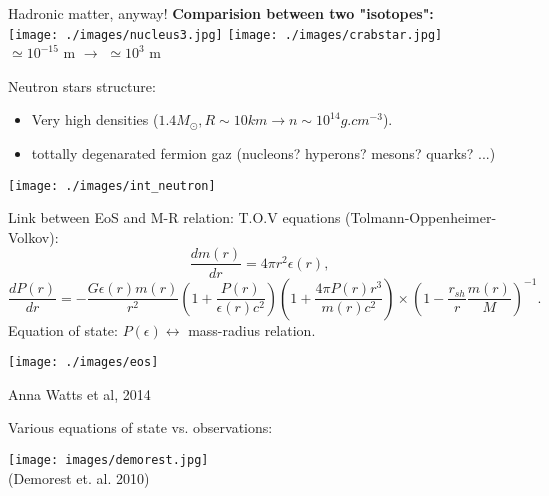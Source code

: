 \documentclass[francais]{beamer}
\begin{document}
\begin{frame}{Hadronic matter, anyway!}
\textbf{Comparision between two "isotopes":}\\
\texttt{[image: ./images/nucleus3.jpg]}\hfill
\texttt{[image: ./images/crabstar.jpg]}\\
\vspace{+0.5cm}
$\simeq 10^{-15}$ m \hspace{+3cm} $\longrightarrow$ \hspace{+3cm} $\simeq 10^{3} $ m
\end{frame}

\begin{frame}{Neutron stars structure: }
\begin{itemize}
\color{white}
	\item Very high densities ($1.4M_{\odot},R \sim 10 km \rightarrow n \sim 10^{14} g.cm^{-3}$).
	\item tottally degenarated fermion gaz (nucleons? hyperons? mesons? quarks? ...)
\end{itemize}
\begin{center}
\texttt{[image: ./images/int\_neutron]}
\end{center}
\end{frame}



\begin{frame}{Link between EoS and M-R relation:}
T.O.V equations (Tolmann-Oppenheimer-Volkov):
{\scriptsize
\begin{equation}
\dfrac{dm(r)}{dr} =  4\pi r^2 \epsilon(r),
\end{equation}
\begin{equation}
\dfrac{dP(r)}{dr} =  -\dfrac{G\epsilon(r) m(r)}{r^2}\left(1+\dfrac{P(r)}{\epsilon(r)c^2}\right) \left( 1+\dfrac{4\pi P(r) r^3}{m(r)c^2}\right) \times  \left( 1- \dfrac{r_{sh}}{r} \dfrac{m(r)}{M}\right)^{-1}.
\end{equation}
}
Equation of state: $P(\epsilon)\leftrightarrow$ mass-radius relation.
\vspace{-0.2cm}
\begin{center}
\texttt{[image: ./images/eos]}
\end{center}
\vspace{-0.4cm}	
{\scriptsize Anna Watts et al, 2014}
\end{frame}


\begin{frame}{Various equations of state vs. observations:}
\begin{center}
\texttt{[image: images/demorest.jpg]}\\

{\small (Demorest et. al. 2010)}
\end{center}
\end{frame}
\end{document}
